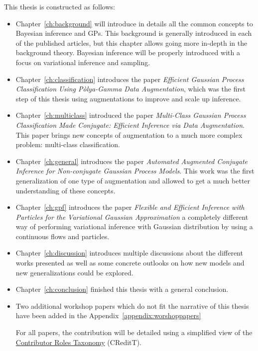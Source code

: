 This thesis is constructed as follows:
\begin{itemize}
    \item Chapter~\ref{ch:background} will introduce in details all the common concepts to Bayesian inference and \ac{GPs}.
          This background is generally introduced in each of the published articles, but this chapter allows going more in-depth in the background theory.
          Bayesian inference will be properly introduced with a focus on variational inference and sampling.
    \item Chapter~\ref{ch:classification} introduces the paper \textit{Efficient Gaussian Process Classification Using P\`olya-Gamma Data Augmentation}, which was the first step of this thesis using augmentations to improve and scale up inference.
    \item Chapter~\ref{ch:multiclass} introduced the paper \textit{Multi-Class Gaussian Process Classification Made Conjugate: Efficient Inference via Data Augmentation}.
          This paper brings new concepts of augmentation to a much more complex problem: multi-class classification.
    \item Chapter~\ref{ch:general} introduces the paper \textit{Automated Augmented Conjugate Inference for Non-conjugate Gaussian Process Models}.
          This work was the first generalization of one type of augmentation and allowed to get a much better understanding of these concepts.
    \item Chapter~\ref{ch:gpf} introduces the paper \textit{Flexible and Efficient Inference with Particles for the Variational Gaussian Approximation } a completely different way of performing variational inference with Gaussian distribution by using a continuous flows and particles.
    \item Chapter~\ref{ch:discussion} introduces multiple discussions about the different works presented as well as some concrete outlooks on how new models and new generalizations could be explored.
    \item Chapter~\ref{ch:conclusion} finished this thesis with a general conclusion.
    \item Two additional workshop papers which do not fit the narrative of this thesis have been added in the Appendix~\ref{appendix:worshoppapers}

    For all papers, the contribution will be detailed using a simplified view of the \href{https://mdpi-res.com/data/contributor-role-instruction.pdf}{Contributor Roles Taxonomy} (CReditT).

\end{itemize}

